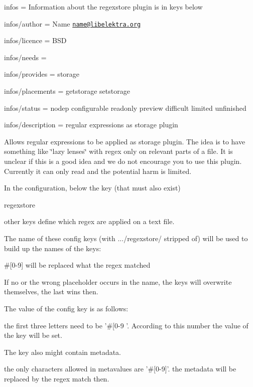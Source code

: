 
\begin{DoxyItemize}
\item infos = Information about the regexstore plugin is in keys below
\item infos/author = Name \href{mailto:name@libelektra.org}{\tt name@libelektra.\+org}
\item infos/licence = B\+S\+D
\item infos/needs =
\item infos/provides = storage
\item infos/placements = getstorage setstorage
\item infos/status = nodep configurable readonly preview difficult limited unfinished
\item infos/description = regular expressions as storage plugin
\end{DoxyItemize}

Allows regular expressions to be applied as storage plugin. The idea is to have something like \char`\"{}lazy lenses\char`\"{} with regex only on relevant parts of a file. It is unclear if this is a good idea and we do not encourage you to use this plugin. Currently it can only read and the potential harm is limited.

In the configuration, below the key (that must also exist) \begin{DoxyVerb}regexstore
\end{DoxyVerb}


other keys define which regex are applied on a text file.

The name of these config keys (with .../regexstore/ stripped of) will be used to build up the names of the keys\+:
\begin{DoxyItemize}
\item \#\mbox{[}0-\/9\mbox{]} will be replaced what the regex matched
\item If no or the wrong placeholder occurs in the name, the keys will overwrite themselves, the last wins then.
\end{DoxyItemize}

The value of the config key is as follows\+:
\begin{DoxyItemize}
\item the first three letters need to be '\#\mbox{[}0-\/9 '. According to this number the value of the key will be set.
\end{DoxyItemize}

The key also might contain metadata.
\begin{DoxyItemize}
\item the only characters allowed in metavalues are '\#\mbox{[}0-\/9\mbox{]}'. the metadata will be replaced by the regex match then.
\end{DoxyItemize}

